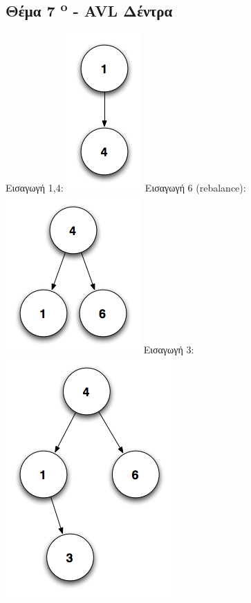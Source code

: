 \documentclass[a4paper,10pt]{article}
\begin{document}
\subsection{Θέμα 7 \textsuperscript{o} - AVL Δέντρα}
Εισαγωγή 1,4:
\includegraphics[scale=0.3]{files/im1_4.png}
Εισαγωγή 6 (rebalance):
\includegraphics[scale=0.3]{files/im2_6.png}
Εισαγωγή 3:
\includegraphics[scale=0.3]{files/im3_3.png}
\end{document}
